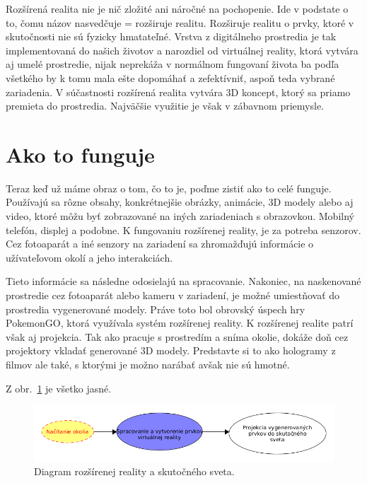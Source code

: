 \documentclass[10pt,twoside,a4paper]{article}
\begin{document}
Rozšírená realita nie je nič zložité ani náročné na pochopenie. Ide v podstate o to, čomu názov nasvedčuje = rozširuje realitu. Rozširuje realitu o prvky, ktoré v skutočnosti nie sú fyzicky hmatateľné. Vrstva z digitálneho prostredia je tak implementovaná do našich životov a narozdiel od virtuálnej reality, ktorá vytvára aj umelé prostredie, nijak neprekáža v normálnom fungovaní života ba podľa všetkého by k tomu mala ešte dopomáhať a zefektívniť, aspoň teda vybrané zariadenia. V súčastnosti rozšírená realita vytvára  3D koncept, ktorý sa priamo premieta do prostredia. Najväčšie využitie je však v zábavnom priemysle.

\section{Ako to funguje}\label{ako}

Teraz keď už máme obraz o tom, čo to je, poďme zistiť ako to celé funguje. Používajú sa rôzne obsahy, konkrétnejšie obrázky, animácie, 3D modely alebo aj video, ktoré môžu byť zobrazované na iných zariadeniach  s obrazovkou. Mobilný telefón, displej a podobne. K fungovaniu rozšírenej reality, je za potreba senzorov. Cez fotoaparát a iné senzory na zariadení sa zhromažďujú informácie o užívateľovom okolí a jeho interakciách. \par Tieto informácie sa následne odosielajú na spracovanie. Nakoniec, na naskenované prostredie cez fotoaparát alebo kameru v zariadení, je možné umiestňovať do prostredia vygenerované modely. Práve toto bol obrovský úspech hry PokemonGO, ktorá využívala systém rozšírenej reality. K rozšírenej realite patrí však aj projekcia. Tak ako pracuje s prostredím a sníma okolie, dokáže doň cez projektory vkladať generované 3D modely. Predstavte si to ako hologramy z filmov ale také, s ktorými je možno narábať avšak nie sú hmotné.

Z obr.~\ref{f:rozhod} je všetko jasné. 

\begin{figure}[tbh]
\centering
\includegraphics[scale=0.5]{Diagram fungovania AR.png}
\caption{Diagram rozšírenej reality a skutočného sveta.}
\label{f:rozhod}
\end{figure}
\end{document}
